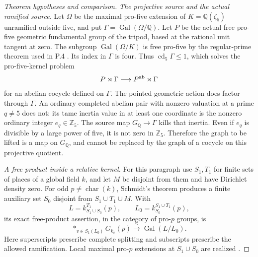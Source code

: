 \begin{proof}[Theorem hypotheses and comparison]
\emph{The projective source and the actual ramified source.}
Let $\Omega$ be the maximal pro-five extension of
$K=\mathbb Q(\zeta_5)$ unramified outside five, and put
$\Gamma=\operatorname{Gal}(\Omega/\mathbb Q)$.
Let $P$ be the actual free pro-five geometric fundamental group
of the tripod, based at the rational unit tangent at zero.
The subgroup $\operatorname{Gal}(\Omega/K)$ is free pro-five
by the regular-prime theorem used in P.4
\citep[Lemma 3.2, author p.~14]{LitHoshi2010}.
Its index in $\Gamma$ is four. Thus $\operatorname{cd}_5\Gamma\le1$,
which solves the pro-five-kernel problem
\[
 P\rtimes\Gamma\longrightarrow P^{\rm ab}\rtimes\Gamma
\]
for an abelian cocycle defined on $\Gamma$.
The pointed geometric action does factor through $\Gamma$.
An ordinary completed abelian pair with nonzero valuation at a
prime $q\ne5$ does not: its tame inertia value in at least one
coordinate is the nonzero ordinary integer $e_q\in\mathbb Z_5$.
The source map $G_{\mathbb Q}\to\Gamma$ kills that inertia.
Even if $e_q$ is divisible by a large power of five, it is not
zero in $\mathbb Z_5$. Therefore the graph to be lifted is a
map on $G_{\mathbb Q}$, and cannot be replaced by the graph of
a cocycle on this projective quotient.

\emph{A free product inside a relative kernel.}
For this paragraph use $S_1,T_1$ for finite sets of places of a
global field $k$, and let $M$ be disjoint from them and have
Dirichlet density zero. For odd $p\ne\operatorname{char}(k)$,
Schmidt's theorem produces a finite auxiliary set $S_0$ disjoint
from $S_1\cup T_1\cup M$. With
\[
 L=k^{T_1}_{S_1\cup S_0}(p),\qquad
 L_0=k^{S_1\cup T_1}_{S_0}(p),
\]
its exact free-product assertion, in the category of pro-$p$ groups, is
\[
 \mathop{\ast}_{v\in S_1(L_0)}G_{k_v}(p)
       \xrightarrow{\ \sim\ }\operatorname{Gal}(L/L_0).
                                                               \tag{P.15.2}
\]
Here superscripts prescribe complete splitting and subscripts
prescribe the allowed ramification. Local maximal pro-$p$
extensions at $S_1\cup S_0$ are realized
\citep[Theorem 1.1(ii)--(iii), author p.~2;
Proposition 7.1 and its proof, pp.~19--20]{RootSchmidt2010}.


\end{proof}
